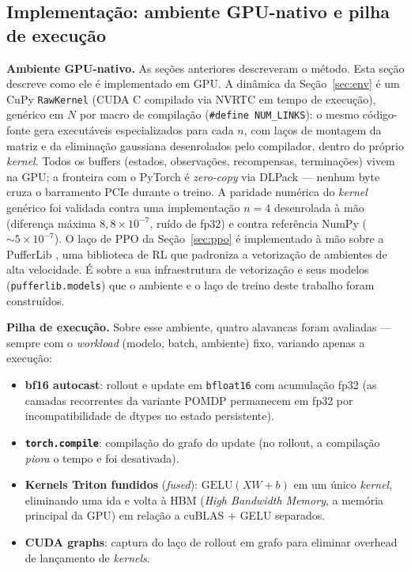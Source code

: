 \documentclass[12pt]{article}
\begin{document}
\subsection{Implementação: ambiente GPU-nativo e pilha de execução}
\label{sec:sistemas}

\textbf{Ambiente GPU-nativo.} As seções anteriores descreveram o método. Esta
seção descreve como ele é implementado em GPU. A dinâmica da Seção~\ref{sec:env} é um CuPy
\texttt{RawKernel} (CUDA C compilado via NVRTC em tempo de execução), genérico
em $N$ por macro de compilação (\texttt{\#define NUM\_LINKS}): o mesmo
código-fonte gera executáveis especializados para cada $n$, com laços de
montagem da matriz e da eliminação gaussiana desenrolados pelo compilador,
dentro do próprio \emph{kernel}. Todos os buffers (estados, observações,
recompensas, terminações) vivem na GPU; a fronteira com o PyTorch é
\emph{zero-copy} via DLPack --- nenhum byte cruza o barramento PCIe durante o
treino. A paridade numérica do \emph{kernel} genérico foi validada contra uma
implementação $n{=}4$ desenrolada à mão (diferença máxima
$8{,}8\times10^{-7}$, ruído de fp32) e contra referência NumPy
($\sim 5\times10^{-7}$). O laço de PPO da Seção~\ref{sec:ppo} é implementado à
mão sobre a PufferLib \cite{suarez2024}, uma biblioteca de RL que padroniza a
vetorização de ambientes de alta velocidade. É sobre a sua infraestrutura de
vetorização e seus modelos (\texttt{pufferlib.models}) que o ambiente e o laço
de treino deste trabalho foram construídos.

\textbf{Pilha de execução.} Sobre esse ambiente, quatro alavancas foram
avaliadas --- sempre com o \emph{workload} (modelo, batch, ambiente) fixo,
variando apenas a execução:

\begin{itemize}
  \item \textbf{bf16 autocast}: rollout e update em \texttt{bfloat16} com
    acumulação fp32 (as camadas recorrentes da variante POMDP permanecem em
    fp32 por incompatibilidade de dtypes no estado persistente).
  \item \textbf{\texttt{torch.compile}}: compilação do grafo do update
    (no rollout, a compilação \emph{piora} o tempo e foi desativada).
  \item \textbf{Kernels Triton fundidos} (\emph{fused}): $\mathrm{GELU}(XW+b)$ em um único
    \emph{kernel}, eliminando uma ida e volta à HBM (\emph{High Bandwidth
    Memory}, a memória principal da GPU) em relação a cuBLAS $+$ GELU
    separados.
  \item \textbf{CUDA graphs}: captura do laço de rollout em grafo para
    eliminar overhead de lançamento de \emph{kernels}.
\end{itemize}
\end{document}
